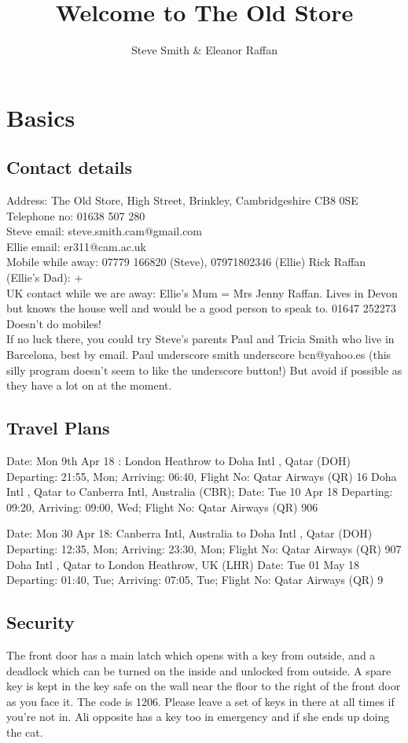 \documentclass[11pt]{article}
\title{\textbf{Welcome to The Old Store}}
\author{Steve Smith \& Eleanor Raffan}
\begin{document}
\maketitle

\newpage

\section{Basics}
\subsection*{Contact details}
Address: The Old Store, High Street, Brinkley, Cambridgeshire CB8 0SE
\\Telephone no: 01638 507 280
\\Steve email: steve.smith.cam@gmail.com
\\Ellie email: er311@cam.ac.uk
\\Mobile while away: 07779 166820 (Steve), 07971802346 (Ellie) Rick Raffan (Ellie's Dad): +
\\UK contact while we are away: Ellie's Mum = Mrs Jenny Raffan.  Lives in Devon but knows the house well and would be a good person to speak to.  01647 252273  Doesn't do mobiles!  
\\If no luck there, you could try Steve's parents Paul and Tricia Smith who live in Barcelona, best by email.  Paul underscore smith underscore bcn@yahoo.es  (this silly program doesn't seem to like the underscore button!)  But avoid if possible as they have a lot on at the moment.

\subsection*{Travel Plans}

Date: Mon 9th Apr 18 : London Heathrow to Doha Intl , Qatar (DOH) Departing: 21:55, Mon; Arriving: 06:40, Flight No: Qatar Airways (QR) 16
Doha Intl , Qatar to Canberra Intl, Australia (CBR); Date: Tue 10 Apr 18 Departing: 09:20, Arriving: 09:00, Wed; Flight No: Qatar Airways (QR) 906

Date: Mon 30 Apr 18: Canberra Intl, Australia to Doha Intl , Qatar (DOH) Departing: 12:35, Mon; Arriving: 23:30, Mon; Flight No: Qatar Airways (QR) 907
Doha Intl , Qatar to London Heathrow, UK (LHR) Date: Tue 01 May 18 Departing: 01:40, Tue; Arriving: 07:05, Tue; Flight No: Qatar Airways (QR) 9

\subsection*{Security} 
The front door has a main latch which opens with a key from outside, and a deadlock which can be turned on the inside and unlocked from outside. A spare key is kept in the key safe on the wall near the floor to the right of the front door as you face it. The code is 1206. Please leave a set of keys in there at all times if you're not in.  Ali opposite has a key too in emergency and if she ends up doing the cat.  
\end{document}
